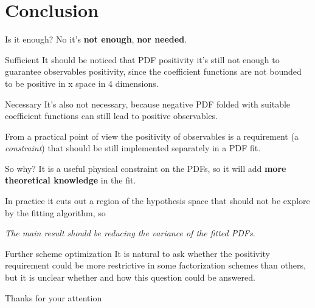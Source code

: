 \documentclass[9pt]{beamer}
\begin{document}
\section{Conclusion}
\begin{frame}{Is it enough?}
    No it's \textbf{not enough}, \textbf{nor needed}.

    \begin{block}{Sufficient}
    It should be noticed that PDF positivity it's still not enough to guarantee
    observables positivity, since the coefficient functions are not bounded to
    be positive in x space in 4 dimensions.
    \end{block}

    \begin{block}{Necessary}
    It's also not necessary, because negative PDF folded with suitable
    coefficient functions can still lead to positive observables.
    \end{block}

    From a practical point of view the positivity of observables is a
    requirement (a \textit{constraint}) that should be still implemented
    separately in a PDF fit.
\end{frame}

\begin{frame}{So why?}
    \vspace*{10pt}
    It is a useful physical constraint on the PDFs, so it will add
    \textbf{more theoretical knowledge} in the fit.

    In practice it cuts out a region of the hypothesis space that should not be
    explore by the fitting algorithm, so

    \begin{center}
        \textit{The main result should be reducing the variance of the fitted PDFs.}
    \end{center}

    \vspace*{25pt}
    \begin{block}{Further scheme optimization}
        It is natural to ask whether the positivity requirement could be more
        restrictive in some factorization schemes than others, but it is
        unclear  whether  and  how  this  question  could  be  answered.
    \end{block}
\end{frame}

\begin{frame}[standout]
    Thanks for your attention
\end{frame}
\end{document}
